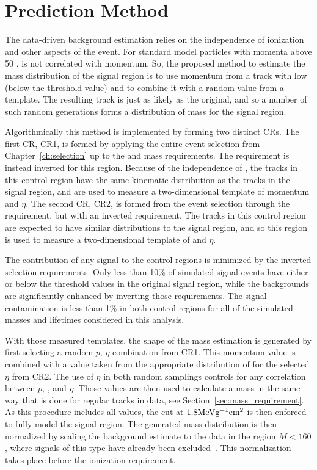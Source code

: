 
\section{Prediction Method}

The data-driven background estimation relies on the independence of ionization and other aspects of the event.
For standard model particles with momenta above 50 \GeV, \dedx is not correlated with momentum.
So, the proposed method to estimate the mass distribution of the signal region is to use momentum from a track with low \dedx (below the threshold value) and to combine it with a random \dedx value from a \dedx template.
The resulting track is just as likely as the original, and so a number of such random generations forms a distribution of mass for the signal region.

Algorithmically this method is implemented by forming two distinct \acp{CR}.
The first \ac{CR}, CR1, is formed by applying the entire event selection from Chapter~\ref{ch:selection} up to the \dedx and mass requirements.
The \dedx requirement is instead inverted for this region.
Because of the independence of \dedx, the tracks in this control region have the same kinematic distribution as the tracks in the signal region, and are used to measure a two-dimensional template of momentum and $\eta$. 
The second \ac{CR}, CR2, is formed from the event selection through the \dedx requirement, but with an inverted \met requirement.
The tracks in this control region are expected to have similar \dedx distributions to the signal region, and so this region is used to measure a two-dimensional template of \dedx and $\eta$. 

The contribution of any signal to the control regions is minimized by the inverted selection requirements.
Only less than 10\% of simulated signal events have either \dedx or \met below the threshold values in the original signal region, while the backgrounds are significantly enhanced by inverting those requirements.
The signal contamination is less than 1\% in both control regions for all of the simulated masses and lifetimes considered in this analysis.

With those measured templates, the shape of the mass estimation is generated by first selecting a random $p$, $\eta$ combination from CR1. 
This momentum value is combined with a \dedx value taken from the appropriate distribution of \dedx for the selected $\eta$ from CR2. 
The use of $\eta$ in both random samplings controls for any correlation between $p$, \dedx, and $\eta$. 
Those values are then used to calculate a mass in the same way that is done for regular tracks in data, see Section~\ref{sec:mass_requirement}.
As this procedure includes all \dedx values, the cut at $1.8 \mathrm{Me\kern -0.05em V}\mathrm{g}^{-1}\mathrm{cm}^2$ is then enforced to fully model the signal region.
The generated mass distribution is then normalized by scaling the background estimate to the data in the region $M < 160$ \GeV, where signals of this type have already been excluded~\cite{SUSY-2014-09}.
This normalization takes place before the ionization requirement.

